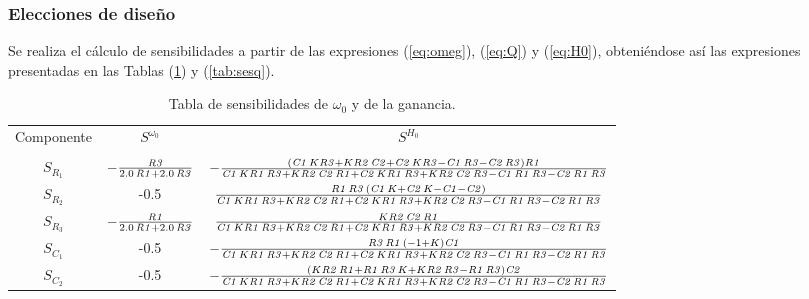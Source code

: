 \subsubsection{Elecciones de diseño}
Se realiza el cálculo de sensibilidades a partir de las expresiones (\ref{eq:omeg}), (\ref{eq:Q}) y (\ref{eq:H0}), obteniéndose así las expresiones presentadas en las Tablas (\ref{tab:senswyg}) y (\ref{tab:sesq}).
\begin{table}[H]
\centering
\begin{tabular}{ccc}
\hline
Componente & $S^{\omega_0}$ & $S^{H_0}$ \\ \cline{1-3}\\
$S_{R_1}$  & $-{\frac {{\it R3}}{ 2.0\,{\it R1}+ 2.0\,{\it R3}}}$    &$ -{\frac { \left( {\it C1}\,K{\it R3}+K{\it R2}\,{\it C2}+{\it C2}\,K{
\it R3}-{\it C1}\,{\it R3}-{\it C2}\,{\it R3} \right) {\it R1}}{{\it 
C1}\,K{\it R1}\,{\it R3}+K{\it R2}\,{\it C2}\,{\it R1}+{\it C2}\,K{
\it R1}\,{\it R3}+K{\it R2}\,{\it C2}\,{\it R3}-{\it C1}\,{\it R1}\,{
\it R3}-{\it C2}\,{\it R1}\,{\it R3}}} $  \\
$S_{R_2}$  & -0.5    & ${\frac {{\it R1}\,{\it R3}\, \left( {\it C1}\,K+{\it C2}\,K-{\it C1}-{
\it C2} \right) }{{\it C1}\,K{\it R1}\,{\it R3}+K{\it R2}\,{\it C2}\,{
\it R1}+{\it C2}\,K{\it R1}\,{\it R3}+K{\it R2}\,{\it C2}\,{\it R3}-{
\it C1}\,{\it R1}\,{\it R3}-{\it C2}\,{\it R1}\,{\it R3}}}$   \\
$S_{R_3}$  & $-{\frac {{\it R1}}{ 2.0\,{\it R1}+ 2.0\,{\it R3}}}$     & ${\frac {K{\it R2}\,{\it C2}\,{\it R1}}{{\it C1}\,K{\it R1}\,{\it R3}+K
{\it R2}\,{\it C2}\,{\it R1}+{\it C2}\,K{\it R1}\,{\it R3}+K{\it R2}\,
{\it C2}\,{\it R3}-{\it C1}\,{\it R1}\,{\it R3}-{\it C2}\,{\it R1}\,{
\it R3}}}$   \\
$S_{C_1}$  & -0.5    & $-{\frac {{\it R3}\,{\it R1}\, \left( -1+K \right) {\it C1}}{{\it C1}\,
K{\it R1}\,{\it R3}+K{\it R2}\,{\it C2}\,{\it R1}+{\it C2}\,K{\it R1}
\,{\it R3}+K{\it R2}\,{\it C2}\,{\it R3}-{\it C1}\,{\it R1}\,{\it R3}-
{\it C2}\,{\it R1}\,{\it R3}}}$  \\
$S_{C_2}$  & -0.5    & $-{\frac { \left( K{\it R2}\,{\it R1}+{\it R1}\,{\it R3}\,K+K{\it R2}\,
{\it R3}-{\it R1}\,{\it R3} \right) {\it C2}}{{\it C1}\,K{\it R1}\,{
\it R3}+K{\it R2}\,{\it C2}\,{\it R1}+{\it C2}\,K{\it R1}\,{\it R3}+K{
\it R2}\,{\it C2}\,{\it R3}-{\it C1}\,{\it R1}\,{\it R3}-{\it C2}\,{
\it R1}\,{\it R3}}}$ \\
\hline
\end{tabular}
\caption{Tabla de sensibilidades de $\omega_0$ y de la ganancia.}
\label{tab:senswyg}
\end{table}
